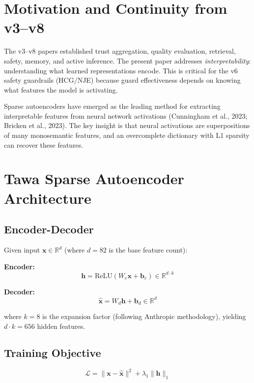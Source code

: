 \documentclass[11pt]{article}
\theoremstyle{plain}
\begin{document}
\section{Motivation and Continuity from v3–v8}

The v3–v8 papers established trust aggregation, quality evaluation, retrieval, safety, memory, and active inference. The present paper addresses \emph{interpretability}: understanding what learned representations encode. This is critical for the v6 safety guardrails (HCG/NJE) because guard effectiveness depends on knowing what features the model is activating.

Sparse autoencoders have emerged as the leading method for extracting interpretable features from neural network activations (Cunningham et al., 2023; Bricken et al., 2023). The key insight is that neural activations are superpositions of many monosemantic features, and an overcomplete dictionary with L1 sparsity can recover these features.


\section{Tawa Sparse Autoencoder Architecture}

\subsection{Encoder-Decoder}

Given input \( \mathbf{x} \in \mathbb{R}^d \) (where \( d = 82 \) is the base feature count):

\textbf{Encoder:}
\begin{equation}
\mathbf{h} = \text{ReLU}(W_e \mathbf{x} + \mathbf{b}_e) \in \mathbb{R}^{d \cdot k}
\end{equation}

\textbf{Decoder:}
\begin{equation}
\hat{\mathbf{x}} = W_d \mathbf{h} + \mathbf{b}_d \in \mathbb{R}^d
\end{equation}

where \( k = 8 \) is the expansion factor (following Anthropic methodology), yielding \( d \cdot k = 656 \) hidden features.

\subsection{Training Objective}

\begin{equation}
\mathcal{L} = \|\mathbf{x} - \hat{\mathbf{x}}\|^2 + \lambda_1 \|\mathbf{h}\|_1
\end{equation}
\end{document}
